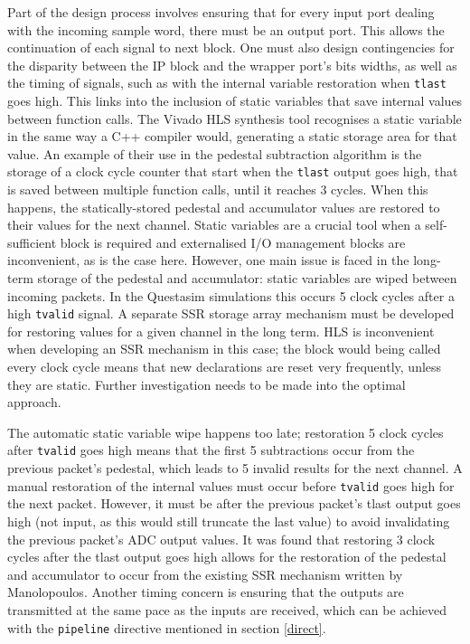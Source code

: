 \documentclass[10pt]{article}
\begin{document}
Part of the design process involves ensuring that for every input port dealing with the incoming sample word, there must be an output port. This allows the continuation of each signal to next block. One must also design contingencies for the disparity between the IP block and the wrapper port's bits widths, as well as the timing of signals, such as with the internal variable restoration when \texttt{tlast} goes high. This links into the inclusion of static variables that save internal values between function calls. The Vivado HLS synthesis tool recognises a static variable in the same way a C++ compiler would, generating a static storage area for that value. An example of their use in the pedestal subtraction algorithm is the storage of a clock cycle counter that start   when the \texttt{tlast} output goes high, that is saved between multiple function calls, until it reaches 3 cycles. When this happens, the statically-stored pedestal and accumulator values are restored to their values for the next channel. Static variables are a crucial tool when a self-sufficient block is required and externalised I/O management blocks are inconvenient, as is the case here. However, one main issue is faced in the long-term storage of the pedestal and accumulator: static variables are wiped between incoming packets. In the Questasim simulations this occurs 5 clock cycles after a high \texttt{tvalid} signal. A separate SSR storage array mechanism must be developed for restoring values for a given channel in the long term. HLS is inconvenient when developing an SSR mechanism in this case; the block would being called every clock cycle means that new declarations are reset very frequently, unless they are static. Further investigation needs to be made into the optimal approach.

The automatic static variable wipe happens too late; restoration 5 clock cycles after \texttt{tvalid} goes high means that the first 5 subtractions occur from the previous packet's pedestal, which leads to 5 invalid results for the next channel. A manual restoration of the internal values must occur before \texttt{tvalid} goes high for the next packet. However, it must be after the previous packet's tlast output goes high (not input, as this would still truncate the last value) to avoid invalidating the previous packet's ADC output values. It was found that restoring 3 clock cycles after the tlast output goes high allows for the restoration of the pedestal and accumulator to occur from the existing SSR mechanism written by Manolopoulos. Another timing concern is ensuring that the outputs are transmitted at the same pace as the inputs are received, which can be achieved with the \texttt{pipeline} directive mentioned in section \ref{direct}. 
\end{document}
